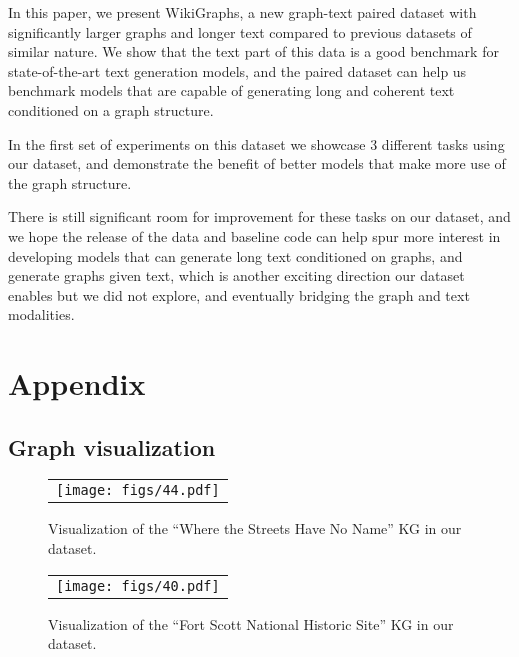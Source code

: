 \documentclass[11pt]{article}
\begin{document}
In this paper, we present WikiGraphs, a new graph-text paired dataset with significantly larger graphs and longer text compared to previous datasets of similar nature.  We show that the text part of this data is a good benchmark for state-of-the-art text generation models, and the paired dataset can help us benchmark models that are capable of generating long and coherent text conditioned on a graph structure.

In the first set of experiments on this dataset we showcase 3 different tasks using our dataset, and demonstrate the benefit of better models that make more use of the graph structure.

There is still significant room for improvement for these tasks on our dataset, and we hope the release of the data and baseline code can help spur more interest in developing models that can generate long text conditioned on graphs, and generate graphs given text, which is another exciting direction our dataset enables but we did not explore, and eventually bridging the graph and text modalities.










\newpage
\appendix

\section{Appendix}
\label{sec:appendix}

\subsection{Graph visualization}
\label{sec:graph_vis}

\begin{figure*}
    \centering
    \begin{tabular}{c}
    \texttt{[image: figs/44.pdf]} \\
    \end{tabular}
    \caption{Visualization of the ``Where the Streets Have No
Name'' KG in our dataset.
}
    \label{fig:graph-1}
\end{figure*}

\begin{figure*}
    \centering
    \begin{tabular}{c}
    \texttt{[image: figs/40.pdf]} \\
    \end{tabular}
    \caption{Visualization of the ``Fort Scott National Historic Site'' KG in our dataset.}
    \label{fig:graph-2}
\end{figure*}
\end{document}
